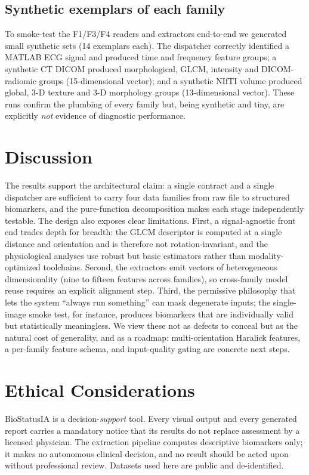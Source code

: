 \documentclass[conference]{IEEEtran}
\begin{document}
\subsection{Synthetic exemplars of each family}
To smoke-test the F1/F3/F4 readers and extractors end-to-end we generated small
synthetic sets (14 exemplars each). The dispatcher correctly identified a
MATLAB ECG signal and produced time and frequency feature groups; a synthetic CT
DICOM produced morphological, GLCM, intensity and DICOM-radiomic groups
(15-dimensional vector); and a synthetic NIfTI volume produced global, 3-D
texture and 3-D morphology groups (13-dimensional vector). These runs confirm
the plumbing of every family but, being synthetic and tiny, are explicitly
\emph{not} evidence of diagnostic performance.

\section{Discussion}
The results support the architectural claim: a single contract and a single
dispatcher are sufficient to carry four data families from raw file to
structured biomarkers, and the pure-function decomposition makes each stage
independently testable. The design also exposes clear limitations. First, a
signal-agnostic front end trades depth for breadth: the GLCM descriptor is
computed at a single distance and orientation and is therefore not
rotation-invariant, and the physiological analyses use robust but basic
estimators rather than modality-optimized toolchains. Second, the extractors
emit vectors of heterogeneous dimensionality (nine to fifteen features across
families), so cross-family model reuse requires an explicit alignment step.
Third, the permissive philosophy that lets the system ``always run something''
can mask degenerate inputs; the single-image smoke test, for instance, produces
biomarkers that are individually valid but statistically meaningless. We view
these not as defects to conceal but as the natural cost of generality, and as a
roadmap: multi-orientation Haralick features, a per-family feature schema, and
input-quality gating are concrete next steps.

\section{Ethical Considerations}
BioStatusIA is a decision-\emph{support} tool. Every visual output and every
generated report carries a mandatory notice that its results do not replace
assessment by a licensed physician. The extraction pipeline computes descriptive
biomarkers only; it makes no autonomous clinical decision, and no result should
be acted upon without professional review. Datasets used here are public and
de-identified.
\end{document}
